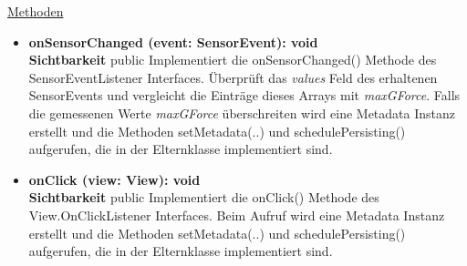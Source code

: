 \underline{Methoden}
\begin{itemize}
\itemsep0pt

\item \textbf{onSensorChanged (event: SensorEvent): void}\hfill\\
\textbf{Sichtbarkeit} public\newline
Implementiert die onSensorChanged() Methode des SensorEventListener Interfaces. Überprüft das \textit{values} Feld des erhaltenen SensorEvents und vergleicht die Einträge dieses Arrays mit \textit{maxGForce}. Falls die gemessenen Werte \textit{maxGForce} überschreiten wird eine Metadata Instanz erstellt und die Methoden setMetadata(..) und schedulePersisting() aufgerufen, die in der Elternklasse implementiert sind.

\item \textbf{onClick (view: View): void}\hfill\\
\textbf{Sichtbarkeit} public\newline
Implementiert die onClick() Methode des View.OnClickListener Interfaces. Beim Aufruf wird eine Metadata Instanz erstellt und die Methoden setMetadata(..) und schedulePersisting() aufgerufen, die in der Elternklasse implementiert sind.

\end{itemize}